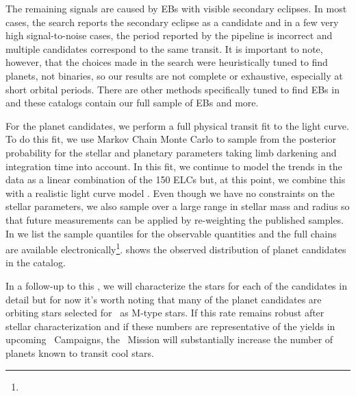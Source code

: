 The remaining signals are caused by EBs with visible secondary eclipses.
In most cases, the search reports the secondary eclipse as a candidate and in
a few very high signal-to-noise cases, the period reported by the pipeline is
incorrect and multiple candidates correspond to the same transit.
It is important to note, however, that the choices made in the search were
heuristically tuned to find planets, not binaries, so our results are not
complete or exhaustive, especially at short orbital periods.
There are other methods specifically tuned to find EBs in \KT\
\citep[such as][]{Armstrong:2014, Armstrong:2015} and these catalogs contain
our full sample of EBs and more.

For the planet candidates, we perform a full physical transit fit to the light
curve.
To do this fit, we use Markov Chain Monte Carlo
\citep[MCMC;][]{Foreman-Mackey:2013} to
sample from the posterior probability for the stellar and planetary
parameters taking limb darkening and integration time into account.
In this fit, we continue to model the trends in the data as a linear
combination of the 150 ELCs but, at this point, we combine this with a
realistic light curve model \citep{Mandel:2002, Kipping:2013a}.
Even though we have no constraints on the stellar parameters, we also sample
over a large range in stellar mass and radius so that future measurements can
be applied by re-weighting the published samples.
In  we list the sample quantiles for the observable quantities and
the full chains are available electronically\footnote{\datareleaseurl}.
\fig{candidates} shows the observed distribution of planet candidates in the
catalog.

In a follow-up to this \paper, we will characterize the stars for each of the
candidates in detail but for now it's worth noting that many of the planet
candidates are orbiting stars selected for \KT\ as M-type stars.
If this rate remains robust after stellar characterization and if these
numbers are representative of the yields in upcoming \KT\ Campaigns, the \KT\
Mission will substantially increase the number of planets known to transit
cool stars.

